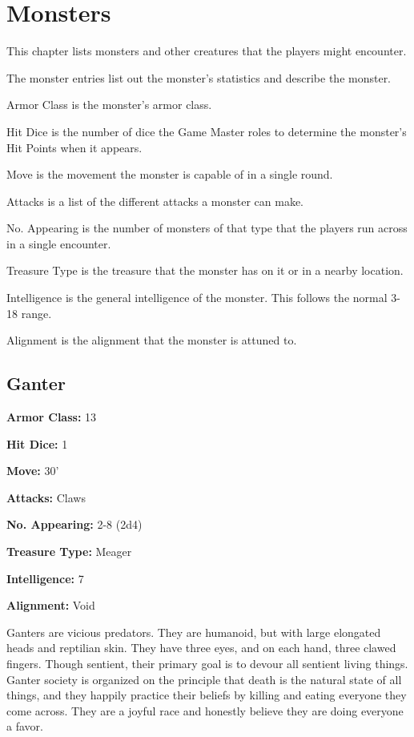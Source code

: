 \chapter{Monsters}

\begin{multicols}{2}

This chapter lists monsters and other creatures that the
players might encounter.

The monster entries list out the monster's statistics and
describe the monster.

Armor Class is the monster's armor class.

Hit Dice is the number of dice the Game Master roles to
determine the monster's Hit Points when it appears.

Move is the movement the monster is capable of in a single
round.

Attacks is a list of the different attacks a monster can
make.

No. Appearing is the number of monsters of that type that
the players run across in a single encounter.

Treasure Type is the treasure that the monster has on it or
in a nearby location.

Intelligence is the general intelligence of the monster. This
follows the normal 3-18 range.

Alignment is the alignment that the monster is attuned to.

\section{Ganter}

\textbf{Armor Class:} 13

\textbf{Hit Dice:} 1

\textbf{Move:} 30'

\textbf{Attacks:} Claws

\textbf{No. Appearing:} 2-8 (2d4)

\textbf{Treasure Type:} Meager

\textbf{Intelligence:} 7

\textbf{Alignment:} Void

Ganters are vicious predators. They are humanoid, but with large
elongated heads and reptilian skin. They have three eyes, and on
each hand, three clawed fingers. Though sentient, their primary
goal is to devour all sentient living things. Ganter society is
organized on the principle that death is the natural state of
all things, and they happily practice their beliefs by killing
and eating everyone they come across. They are a joyful race and
honestly believe they are doing everyone a favor.


\end{multicols}
